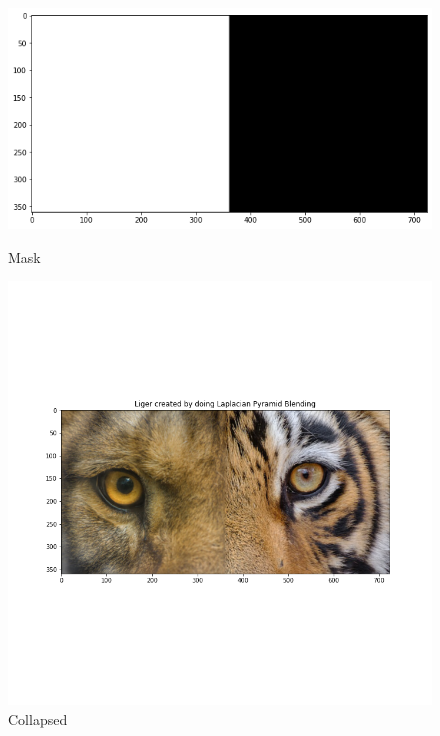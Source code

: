 \documentclass{article}
\begin{document}
\begin{figure}[!htb]
    \includegraphics[width=\linewidth]{liger_mask.png}
    \caption{Mask}
\endminipage
{}
    \includegraphics[width=\linewidth]{liger.png}
    \caption{Collapsed}
\endminipage
\end{figure}
\end{document}
